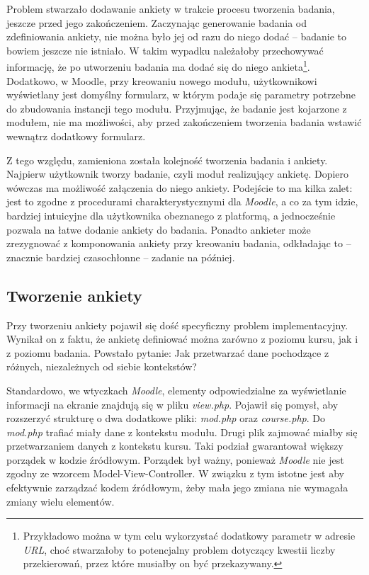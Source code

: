 Problem stwarzało dodawanie ankiety w trakcie procesu tworzenia badania, jeszcze przed jego zakończeniem. Zaczynając generowanie badania od zdefiniowania ankiety, nie można było jej od razu do niego dodać -- badanie to bowiem jeszcze nie istniało. W takim wypadku należałoby przechowywać informację, że po utworzeniu badania ma dodać się do niego ankieta\footnote{Przykładowo można w tym celu wykorzystać dodatkowy parametr w adresie \textit{URL}, choć stwarzałoby to potencjalny problem dotyczący kwestii liczby przekierowań, przez które musiałby on być przekazywany.}. Dodatkowo, w Moodle, przy kreowaniu nowego modułu, użytkownikowi wyświetlany jest domyślny formularz, w którym podaje się parametry potrzebne do zbudowania instancji tego modułu. Przyjmując, że badanie jest kojarzone z modułem, nie ma możliwości, aby przed zakończeniem tworzenia badania wstawić wewnątrz dodatkowy formularz.

Z tego względu, zamieniona została kolejność tworzenia badania i ankiety. Najpierw użytkownik tworzy badanie, czyli moduł realizujący ankietę. Dopiero wówczas ma możliwość załączenia do niego ankiety. Podejście to ma kilka zalet: jest to zgodne z procedurami charakterystycznymi dla \textit{Moodle}, a co za tym idzie, bardziej intuicyjne dla użytkownika obeznanego z platformą, a jednocześnie pozwala na łatwe dodanie ankiety do badania. Ponadto ankieter może zrezygnować z komponowania ankiety przy kreowaniu badania, odkładając to -- znacznie bardziej czasochłonne -- zadanie na później.

\subsection{Tworzenie ankiety}
\label{Chapter629}

Przy tworzeniu ankiety pojawił się dość specyficzny problem implementacyjny. Wynikał on z faktu, że ankietę definiować można zarówno z poziomu kursu, jak i z poziomu badania. Powstało pytanie: Jak przetwarzać dane pochodzące z różnych, niezależnych od siebie kontekstów?

Standardowo, we wtyczkach \textit{Moodle}, elementy odpowiedzialne za wyświetlanie informacji na ekranie znajdują się w pliku \textit{view.php}. Pojawił się pomysł, aby rozszerzyć strukturę o dwa dodatkowe pliki: \textit{mod.php} oraz \textit{course.php}. Do \textit{mod.php} trafiać miały dane z kontekstu modułu. Drugi plik zajmować miałby się przetwarzaniem danych z kontekstu kursu. Taki podział gwarantował większy porządek w kodzie źródłowym. Porządek był ważny, ponieważ \textit{Moodle} nie jest zgodny ze wzorcem Model-View-Controller. W związku z tym istotne jest aby efektywnie zarządzać kodem źródłowym, żeby mała jego zmiana nie wymagała zmiany wielu elementów.

